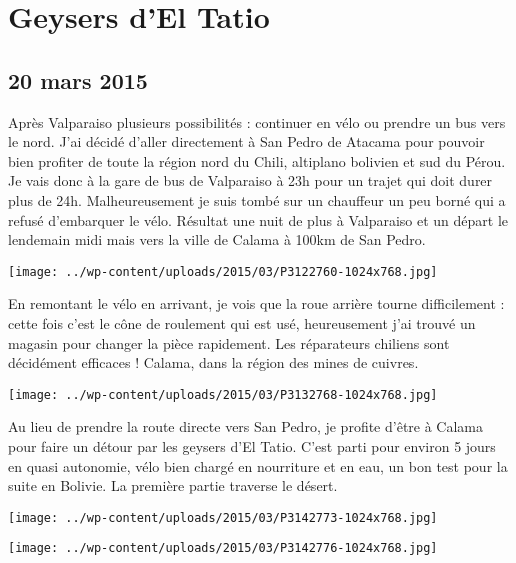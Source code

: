 \chapter{Geysers d’El Tatio}
\section*{20 mars 2015}
Après Valparaiso plusieurs possibilités : continuer en vélo ou prendre un bus vers le nord. J'ai décidé d'aller directement à San Pedro de Atacama pour pouvoir bien profiter de toute la région nord du Chili, altiplano bolivien et sud du Pérou. \newline
 Je vais donc à la gare de bus de Valparaiso à 23h pour un trajet qui doit durer plus de 24h. Malheureusement je suis tombé sur un chauffeur un peu borné qui a refusé d'embarquer le vélo. Résultat une nuit de plus à Valparaiso et un départ le lendemain midi mais vers la ville de Calama à 100km de San Pedro. \newline
 \newline
\centerline{\texttt{[image: ../wp-content/uploads/2015/03/P3122760-1024x768.jpg]} } 
 \newline
 En remontant le vélo en arrivant, je vois que la roue arrière tourne difficilement : cette fois c'est le cône de roulement qui est usé, heureusement j'ai trouvé un magasin pour changer la pièce rapidement. Les réparateurs chiliens sont décidément efficaces ! \newline
 Calama, dans la région des mines de cuivres. \newline
 \newline
\centerline{\texttt{[image: ../wp-content/uploads/2015/03/P3132768-1024x768.jpg]} } 
 \newline
 Au lieu de prendre la route directe vers San Pedro, je profite d'être à Calama pour faire un détour par les geysers d'El Tatio. \newline
 C'est parti pour environ 5 jours en quasi autonomie, vélo bien chargé en nourriture et en eau, un bon test pour la suite en Bolivie. \newline
 La première partie traverse le désert. \newline
 \newline
\centerline{\texttt{[image: ../wp-content/uploads/2015/03/P3142773-1024x768.jpg]} } 
 \newline
\centerline{\texttt{[image: ../wp-content/uploads/2015/03/P3142776-1024x768.jpg]} } 
\newline
